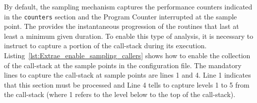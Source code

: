 

By default, the sampling mechanism captures the performance counters indicated in the \texttt{counters} section and the Program Counter interrupted at the sample point.
The \FOLDING provides the instantaneous progression of the routines that last at least a minimum given duration.
To enable this type of analysis, it is necessary to instruct \EXTRAE to capture a portion of the call-stack during its execution.
Listing~\ref{lst:Extrae_enable_sampling_callers} shows how to enable the collection of the call-stack at the sample points in the \EXTRAE configuration file.
The mandatory lines to capture the call-stack at sample points are lines 1 and 4.
Line 1 indicates that this section must be processed and Line 4 tells \EXTRAE to capture levels 1 to 5 from the call-stack (where 1 refers to the level below to the top of the call-stack).


